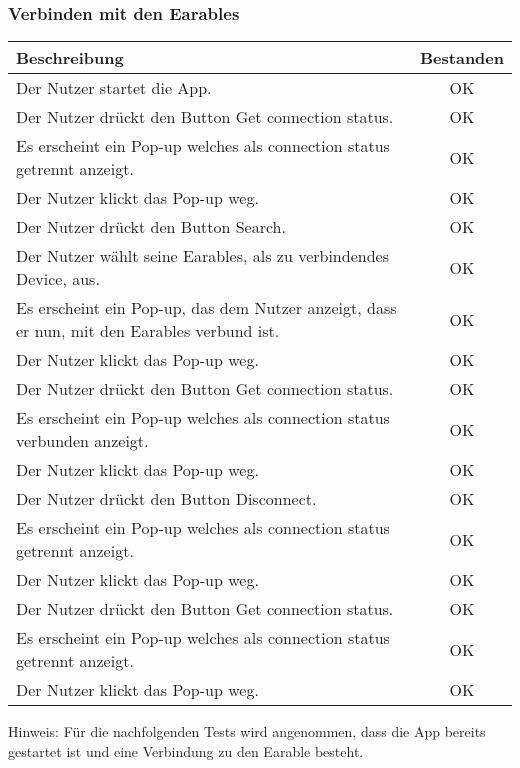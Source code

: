 \documentclass[a4paper,12pt]{article}
\begin{document}
\subsubsection{Verbinden mit den Earables}
\begin{tabular}{ | p{12cm} | c| }
	\hline
	\textbf{Beschreibung} & \textbf{Bestanden}\\
	\hline
	Der Nutzer startet die App. & OK\\
	\hline
	Der Nutzer drückt den Button \glqq{}Get  connection status\grqq{}. & OK\\
	\hline
	Es erscheint ein Pop-up welches als connection status \glqq{}getrennt\grqq{} anzeigt. & OK\\
	\hline
	Der Nutzer klickt das Pop-up weg. & OK\\
	\hline
	Der Nutzer drückt den Button \glqq{}Search\grqq{}. & OK \\
	\hline
	Der Nutzer wählt seine Earables, als zu verbindendes Device, aus. & OK \\
	\hline
	Es erscheint ein Pop-up, das dem Nutzer anzeigt, dass er nun, mit den Earables verbund ist. & OK \\
	\hline
	Der Nutzer klickt das Pop-up weg. & OK \\
	\hline
	Der Nutzer drückt den Button \glqq{}Get  connection status\grqq{}. & OK\\
	\hline
	Es erscheint ein Pop-up welches als connection status \glqq{}verbunden\grqq{} anzeigt. & OK\\
	\hline
	Der Nutzer klickt das Pop-up weg. & OK \\
	\hline
	Der Nutzer drückt den Button \glqq{}Disconnect\grqq{}. & OK\\
	\hline
	Es erscheint ein Pop-up welches als connection status \glqq{}getrennt\grqq{} anzeigt. & OK\\
	\hline
	Der Nutzer klickt das Pop-up weg. & OK\\
	\hline
	Der Nutzer drückt den Button \glqq{}Get  connection status\grqq{}. & OK\\
	\hline
	Es erscheint ein Pop-up welches als connection status \glqq{}getrennt\grqq{} anzeigt. & OK\\
	\hline
	Der Nutzer klickt das Pop-up weg. & OK\\
	\hline
\end{tabular}

Hinweis: Für die nachfolgenden Tests wird angenommen, dass die App bereits gestartet ist und eine Verbindung zu den Earable besteht.
\end{document}
